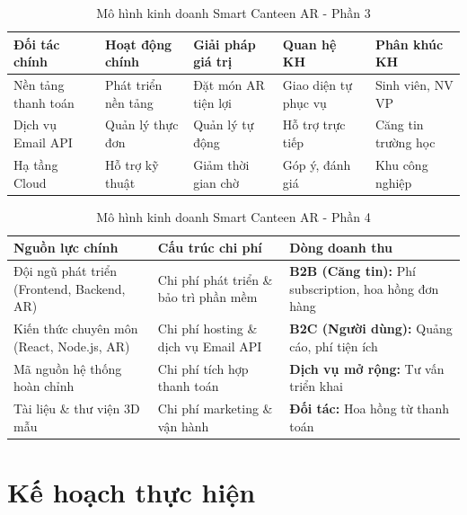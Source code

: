 \documentclass[12pt,a4paper]{article}
\begin{document}
\begin{table}[H]
\centering
\caption{Mô hình kinh doanh Smart Canteen AR - Phần 3}
\label{tab:lean-canvas-3}
\begin{tabular}{@{}>{\raggedright\arraybackslash}p{2.6cm}>{\raggedright\arraybackslash}p{2.6cm}>{\raggedright\arraybackslash}p{2.6cm}>{\raggedright\arraybackslash}p{2.6cm}>{\raggedright\arraybackslash}p{2.6cm}@{}}
\toprule
\textbf{Đối tác chính} & \textbf{Hoạt động chính} & \textbf{Giải pháp giá trị} & \textbf{Quan hệ KH} & \textbf{Phân khúc KH} \\
\midrule
Nền tảng thanh toán & Phát triển nền tảng & Đặt món AR tiện lợi & Giao diện tự phục vụ & Sinh viên, NV VP \\
\midrule
Dịch vụ Email API & Quản lý thực đơn & Quản lý tự động & Hỗ trợ trực tiếp & Căng tin trường học \\
\midrule
Hạ tầng Cloud & Hỗ trợ kỹ thuật & Giảm thời gian chờ & Góp ý, đánh giá & Khu công nghiệp \\
\bottomrule
\end{tabular}
\end{table}

\begin{table}[H]
\centering
\caption{Mô hình kinh doanh Smart Canteen AR - Phần 4}
\label{tab:lean-canvas-4}
\begin{tabular}{@{}>{\raggedright\arraybackslash}p{4.8cm}>{\raggedright\arraybackslash}p{4.8cm}>{\raggedright\arraybackslash}p{4.8cm}@{}}
\toprule
\textbf{Nguồn lực chính} & \textbf{Cấu trúc chi phí} & \textbf{Dòng doanh thu} \\
\midrule
Đội ngũ phát triển (Frontend, Backend, AR) & Chi phí phát triển \& bảo trì phần mềm & \textbf{B2B (Căng tin):} Phí subscription, hoa hồng đơn hàng \\
\midrule
Kiến thức chuyên môn (React, Node.js, AR) & Chi phí hosting \& dịch vụ Email API & \textbf{B2C (Người dùng):} Quảng cáo, phí tiện ích \\
\midrule
Mã nguồn hệ thống hoàn chỉnh & Chi phí tích hợp thanh toán & \textbf{Dịch vụ mở rộng:} Tư vấn triển khai \\
\midrule
Tài liệu \& thư viện 3D mẫu & Chi phí marketing \& vận hành & \textbf{Đối tác:} Hoa hồng từ thanh toán \\
\bottomrule
\end{tabular}
\end{table}


\section{Kế hoạch thực hiện}
\end{document}
